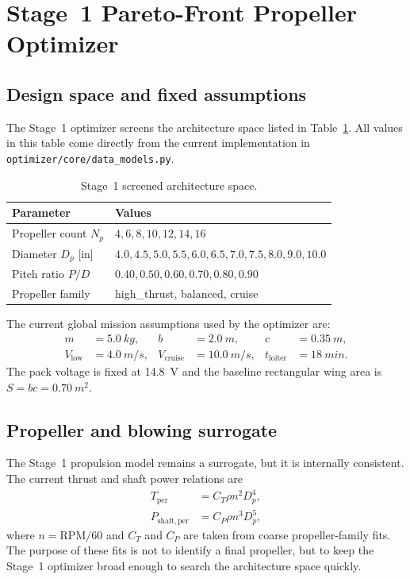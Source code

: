 \documentclass[conf]{new-aiaa}
\begin{document}
\section{Stage~1 Pareto-Front Propeller Optimizer}

\subsection{Design space and fixed assumptions}

The Stage~1 optimizer screens the architecture space listed in Table~\ref{tab:stage1-space}. All values in this table come directly from the current implementation in \texttt{optimizer/core/data\_models.py}.

\begin{table}[H]
\centering
\caption{Stage~1 screened architecture space.}
\label{tab:stage1-space}
\begin{tabular}{@{}ll@{}}
\toprule
Parameter & Values \\
\midrule
Propeller count \(N_p\) & \(4, 6, 8, 10, 12, 14, 16\) \\
Diameter \(D_p\) [in] & \(4.0, 4.5, 5.0, 5.5, 6.0, 6.5, 7.0, 7.5, 8.0, 9.0, 10.0\) \\
Pitch ratio \(P/D\) & \(0.40, 0.50, 0.60, 0.70, 0.80, 0.90\) \\
Propeller family & high\_thrust, balanced, cruise \\
\bottomrule
\end{tabular}
\end{table}

The current global mission assumptions used by the optimizer are:
\begin{align}
m &= \SI{5.0}{kg}, &
b &= \SI{2.0}{m}, &
c &= \SI{0.35}{m}, \\
V_{\mathrm{low}} &= \SI{4.0}{m/s}, &
V_{\mathrm{cruise}} &= \SI{10.0}{m/s}, &
t_{\mathrm{loiter}} &= \SI{18}{min}.
\end{align}
The pack voltage is fixed at \SI{14.8}{V} and the baseline rectangular wing area is \(S=bc=\SI{0.70}{m^2}\).

\subsection{Propeller and blowing surrogate}

The Stage~1 propulsion model remains a surrogate, but it is internally consistent. The current thrust and shaft power relations are
\begin{align}
T_{\mathrm{per}} &= C_T \rho n^2 D_p^4, \\
P_{\mathrm{shaft,per}} &= C_P \rho n^3 D_p^5,
\end{align}
where \(n=\mathrm{RPM}/60\) and \(C_T\) and \(C_P\) are taken from coarse propeller-family fits. The purpose of these fits is not to identify a final propeller, but to keep the Stage~1 optimizer broad enough to search the architecture space quickly.
\end{document}
